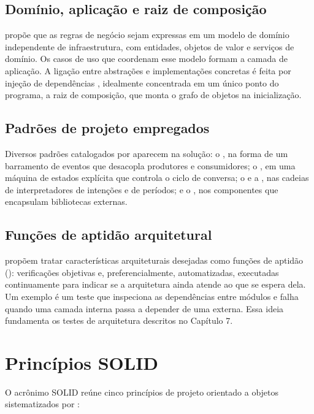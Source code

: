 \subsection{Domínio, aplicação e raiz de composição}

\textcite{evans2004} propõe que as regras de negócio sejam expressas em um modelo de domínio
independente de infraestrutura, com entidades, objetos de valor e serviços de domínio. Os casos de uso
que coordenam esse modelo formam a camada de aplicação. A ligação entre abstrações e implementações
concretas é feita por injeção de dependências \cite{fowler2004}, idealmente concentrada em um único
ponto do programa, a raiz de composição, que monta o grafo de objetos na inicialização.

\subsection{Padrões de projeto empregados}

Diversos padrões catalogados por \textcite{gamma1994} aparecem na solução: o , na forma
de um barramento de eventos que desacopla produtores e consumidores; o , em uma máquina de
estados explícita que controla o ciclo de conversa; o  e a ,
nas cadeias de interpretadores de intenções e de períodos; e o , nos componentes que
encapsulam bibliotecas externas.

\subsection{Funções de aptidão arquitetural}

\textcite{ford2017} propõem tratar características arquiteturais desejadas como funções de aptidão
(): verificações objetivas e, preferencialmente, automatizadas, executadas
continuamente para indicar se a arquitetura ainda atende ao que se espera dela. Um exemplo é um teste
que inspeciona as dependências entre módulos e falha quando uma camada interna passa a depender de uma
externa. Essa ideia fundamenta os testes de arquitetura descritos no Capítulo 7.

\section{Princípios SOLID}

O acrônimo SOLID reúne cinco princípios de projeto orientado a objetos sistematizados por
\textcite{martin2003}:

